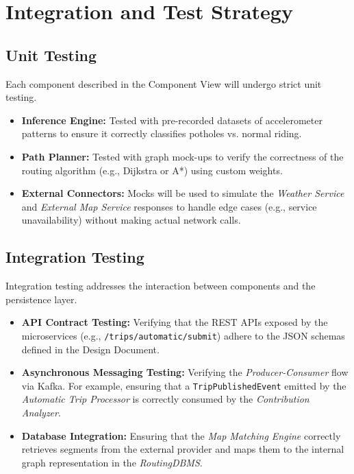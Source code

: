 \section{Integration and Test Strategy}

\subsection{Unit Testing}
Each component described in the Component View will undergo strict unit testing.
\begin{itemize}
    \item \textbf{Inference Engine:} Tested with pre-recorded datasets of accelerometer patterns to ensure it correctly classifies potholes vs. normal riding.
    \item \textbf{Path Planner:} Tested with graph mock-ups to verify the correctness of the routing algorithm (e.g., Dijkstra or A*) using custom weights.
    \item \textbf{External Connectors:} Mocks will be used to simulate the \textit{Weather Service} and \textit{External Map Service} responses to handle edge cases (e.g., service unavailability) without making actual network calls.
\end{itemize}

\subsection{Integration Testing}
Integration testing addresses the interaction between components and the persistence layer.
\begin{itemize}
    \item \textbf{API Contract Testing:} Verifying that the REST APIs exposed by the microservices (e.g., \texttt{/trips/automatic/submit}) adhere to the JSON schemas defined in the Design Document.
    \item \textbf{Asynchronous Messaging Testing:} Verifying the \textit{Producer-Consumer} flow via Kafka. For example, ensuring that a \texttt{TripPublishedEvent} emitted by the \textit{Automatic Trip Processor} is correctly consumed by the \textit{Contribution Analyzer}.
    \item \textbf{Database Integration:} Ensuring that the \textit{Map Matching Engine} correctly retrieves segments from the external provider and maps them to the internal graph representation in the \textit{RoutingDBMS}.
\end{itemize}

